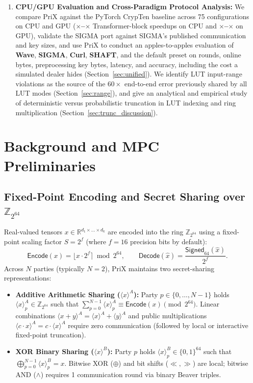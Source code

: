 \documentclass[11pt]{article}
\newcommand{\shareA}[1]{\langle #1 \rangle^{A}}
\newcommand{\shareB}[1]{\langle #1 \rangle^{B}}
\newcommand{\Zring}{\mathbb{Z}_{2^{64}}}
\begin{document}
\begin{enumerate}
    \item \textbf{CPU/GPU Evaluation and Cross-Paradigm Protocol Analysis:} We compare PriX against the PyTorch CrypTen baseline across 75 configurations on CPU and GPU (\textbf{\cpuLlmSpeedupMin$\times$--\cpuLlmSpeedupMax$\times$} Transformer-block speedups on CPU and \textbf{\gpuLlmSpeedupMin$\times$--\gpuLlmSpeedupMax$\times$} on GPU), validate the SIGMA port against SIGMA's published communication and key sizes, and use PriX to conduct an apples-to-apples evaluation of \textbf{Wave}, \textbf{SIGMA}, \textbf{Curl}, \textbf{SHAFT}, and the default preset on rounds, online bytes, preprocessing key bytes, latency, and accuracy, including the cost a simulated dealer hides (Section~\ref{sec:unified}). We identify LUT input-range violations as the source of the $60\times$ end-to-end error previously shared by all LUT modes (Section~\ref{sec:range}), and give an analytical and empirical study of deterministic versus probabilistic truncation in LUT indexing and ring multiplication (Section~\ref{sec:trunc_discussion}).
\end{enumerate}

\section{Background and MPC Preliminaries}
\label{sec:background}

\subsection{Fixed-Point Encoding and Secret Sharing over $\Zring$}
Real-valued tensors $x \in \mathbb{R}^{d_1 \times \dots \times d_k}$ are encoded into the ring $\Zring$ using a fixed-point scaling factor $S = 2^f$ (where $f = 16$ precision bits by default):
\begin{equation}
    \mathsf{Encode}(x) = \lfloor x \cdot 2^f \rceil \bmod 2^{64}, \qquad
    \mathsf{Decode}(\hat{x}) = \frac{\mathsf{Signed}_{64}(\hat{x})}{2^f}.
\end{equation}
Across $N$ parties (typically $N=2$), PriX maintains two secret-sharing representations:
\begin{itemize}
    \item \textbf{Additive Arithmetic Sharing ($\shareA{x}$):} Party $p \in \{0, \dots, N-1\}$ holds $\shareA{x}_p \in \Zring$ such that $\sum_{p=0}^{N-1} \shareA{x}_p \equiv \mathsf{Encode}(x) \pmod{2^{64}}$. Linear combinations $\shareA{x + y} = \shareA{x} + \shareA{y}$ and public multiplications $\shareA{c \cdot x} = c \cdot \shareA{x}$ require zero communication (followed by local or interactive fixed-point truncation).
    \item \textbf{XOR Binary Sharing ($\shareB{x}$):} Party $p$ holds $\shareB{x}_p \in \{0, 1\}^{64}$ such that $\bigoplus_{p=0}^{N-1} \shareB{x}_p = x$. Bitwise XOR ($\oplus$) and bit shifts ($\ll, \gg$) are local; bitwise AND ($\wedge$) requires 1 communication round via binary Beaver triples.
\end{itemize}
\end{document}
